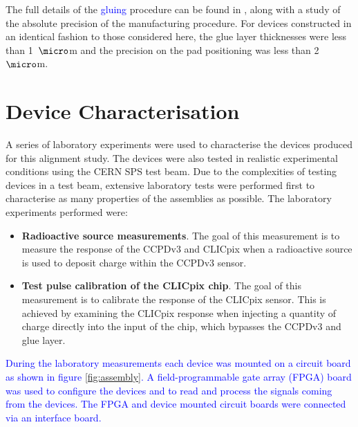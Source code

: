 The full details of the \textcolor{blue}{gluing} procedure can be found in \cite{FabricationNote}, along with a study of the absolute precision of the manufacturing procedure.  For devices constructed in an identical fashion to those considered here, the glue layer thicknesses were less than 1~${\micro}$m and the precision on the pad positioning was less than 2~${\micro}$m.  


\section{Device Characterisation}
A series of laboratory experiments were used to characterise the devices produced for this alignment study.  The devices were also tested in realistic experimental conditions using the CERN SPS test beam.  Due to the complexities of testing devices in a test beam, extensive laboratory tests were performed first to characterise as many properties of the assemblies as possible.  The laboratory experiments performed were:

\begin{itemize}
\item \textbf{Radioactive source measurements}.  The goal of this measurement is to measure the response of the CCPDv3 and CLICpix when a radioactive source is used to deposit charge within the CCPDv3 sensor.  
\item \textbf{Test pulse calibration of the CLICpix chip}.  The goal of this measurement is to calibrate the response of the CLICpix sensor.  This is achieved by examining the CLICpix response when injecting a quantity of charge directly into the input of the chip, which bypasses the CCPDv3 and glue layer.
\end{itemize} 

\textcolor{blue}{During the laboratory measurements each device was mounted on a circuit board as shown in figure \ref{fig:assembly}.  A field-programmable gate array (FPGA) board was used to configure the devices and to read and process the signals coming from the devices.  The FPGA and device mounted circuit boards were connected via an interface board.}

